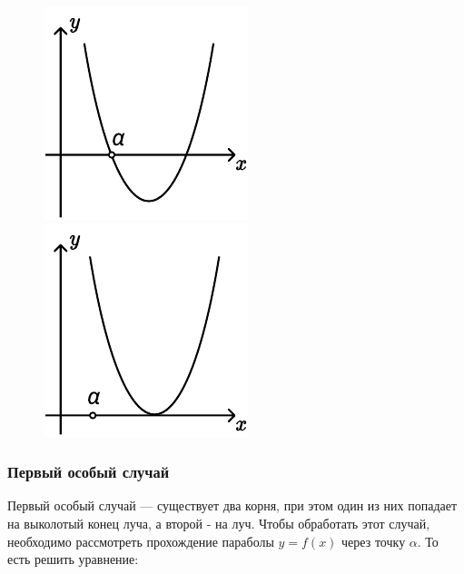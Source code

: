 \begin {figure}[h]
    \begin {minipage} [t] {0.5\linewidth}
        \centering
        \includegraphics [width=0.6\linewidth] {images/image_12.pdf}
    \end {minipage}
    \begin {minipage} [t] {0.5\linewidth}
        \centering
        \includegraphics [width=0.6\linewidth] {images/image_14.pdf}
    \end {minipage}
\end {figure}

\subsubsection {Первый особый случай}

Первый особый случай --- существует два корня, при этом один из них попадает на выколотый конец
луча, а второй - на луч. Чтобы обработать этот случай, необходимо рассмотреть прохождение параболы
$y = f(x)$ через точку $\alpha$. То есть решить уравнение:

